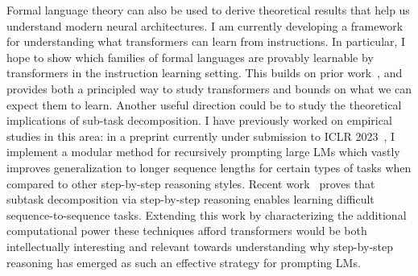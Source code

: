 \documentclass[11pt]{article}
\begin{document}
Formal language theory can also be used to derive theoretical results 
that help us understand modern neural architectures. 
I am currently developing a framework for 
understanding what transformers can learn from instructions. 
In particular, I hope to show which families of formal languages 
are provably learnable by transformers 
in the instruction learning setting.
This builds on prior work~\cite{Merrill2022LogPrecisionTA},
and provides both a principled way to study transformers 
and bounds on what we can expect them to learn.
Another useful direction could be to study
the theoretical implications of sub-task decomposition.
I have previously worked on empirical studies in this area:
in a preprint currently under submission 
to ICLR 2023~\cite{Khot2022DecomposedPA},
I implement a modular method for recursively prompting large LMs 
which vastly improves generalization to longer sequence lengths 
for certain types of tasks 
when compared to other step-by-step reasoning styles.
Recent work~\cite{Wies2022SubTaskDE} 
proves that subtask decomposition
via step-by-step reasoning
enables learning difficult sequence-to-sequence tasks.
Extending this work
by characterizing the additional computational power 
these techniques afford transformers
would be both intellectually interesting
and relevant towards understanding why step-by-step reasoning 
has emerged as such an effective strategy for prompting LMs.
\end{document}
